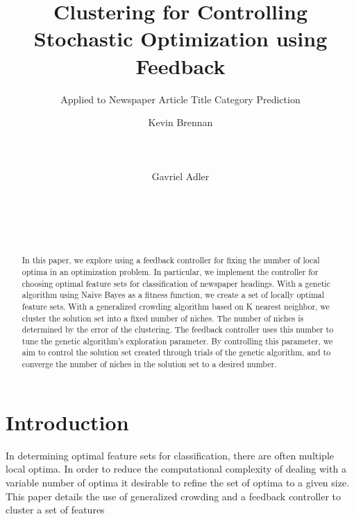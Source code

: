 \documentclass{sig-alternate}
\begin{document}
%

\title{Clustering for Controlling Stochastic Optimization using Feedback}
\subtitle{Applied to Newspaper Article Title Category Prediction}

\author{
\alignauthor
Kevin Brennan\\
       \\
       \\
       \\
\alignauthor
Gavriel Adler\\
       \\
       \\
       \\
       \\
}


\maketitle
\begin{abstract}
In this paper, we explore using a feedback controller for fixing the number of local optima in an optimization problem. In particular, we implement the controller for choosing optimal feature sets for classification of newspaper headings. With a genetic algorithm using Naive Bayes as a fitness function, we create a set of locally optimal feature sets. With a generalized crowding algorithm based on K nearest neighbor, we cluster the solution set into a fixed number of niches. The number of niches is determined by the error of the clustering. The feedback controller uses this number to tune the genetic algorithm's exploration parameter. By controlling this parameter, we aim to control the solution set created through trials of the genetic algorithm, and to converge the number of niches in the solution set to a desired number.	
\end{abstract}



\section{Introduction}
In determining optimal feature sets for classification, there are often multiple local optima. In order to reduce the computational complexity of dealing with a variable number of optima it desirable to refine the set of optima to a given size. This paper details the use of generalized crowding and a feedback controller to cluster a set of features
\end{document}
